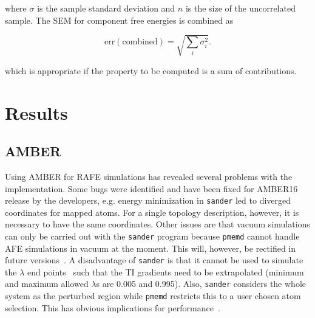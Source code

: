 \documentclass[journal=jctcce,manuscript=article]{achemso}
\newcommand{\progname}[1]{\texttt{#1}}
\begin{document}
where $\sigma$ is the sample standard deviation and $n$ is the size of
the uncorrelated sample.  The SEM for component free energies is combined as

\begin{equation}
  \label{eq:sem-comb}
  \mathrm{err}(\mathrm{combined}) = \sqrt{\sum_i \sigma_i^2}.
\end{equation}

which is appropriate if the property to be computed is a sum of
contributions.


\section{Results}
\label{sec:results}



\subsection{AMBER}
\label{sec:amber-results}

Using AMBER for RAFE simulations has revealed several problems with
the implementation.  Some bugs were identified and have been fixed for AMBER16 
release by the developers, e.g. energy minimization in \progname{sander} led to 
diverged coordinates for mapped atoms.  For a single topology description, 
however, it is necessary to have the same coordinates.  Other issues are that 
vacuum simulations can only be carried out with the \progname{sander} program 
because \progname{pmemd} cannot handle AFE simulations in vacuum at the 
moment.  This will, however, be rectified in future 
versions~\cite{doi:10.1021/acs.jctc.7b00102}.  A disadvantage of 
\progname{sander} is that it cannot be used to simulate the $\lambda$ end 
points~\cite{doi:10.1021/ct400340s} such that the TI gradients need to be 
extrapolated (minimum and maximum allowed $\lambda$s are 0.005 and 0.995). 
 Also, \progname{sander} considers the whole system as the perturbed
region while \progname{pmemd} restricts this to a user chosen atom selection.  This
has obvious implications for performance~\cite{doi:10.1021/ct400340s}.
\end{document}
